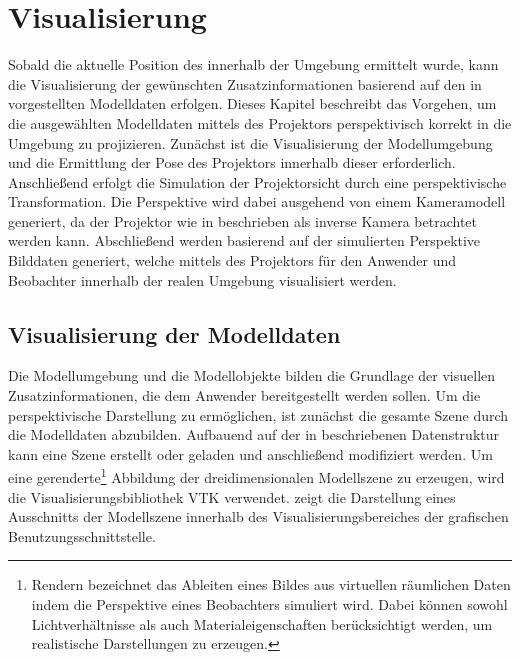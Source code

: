 \chapter{Visualisierung}
\label{chap.vis}

\prever{
}

Sobald die aktuelle Position des  innerhalb der Umgebung ermittelt wurde, kann die Visualisierung der gewünschten Zusatzinformationen basierend auf den in  vorgestellten Modelldaten erfolgen. Dieses Kapitel beschreibt das Vorgehen, um die ausgewählten Modelldaten mittels des Projektors perspektivisch korrekt in die Umgebung zu projizieren. Zunächst ist die Visualisierung der Modellumgebung und die Ermittlung der Pose des Projektors innerhalb dieser erforderlich. Anschließend erfolgt die Simulation der Projektorsicht durch eine perspektivische Transformation. Die Perspektive wird dabei ausgehend von einem Kameramodell generiert, da der Projektor wie in  beschrieben als inverse Kamera betrachtet werden kann. Abschließend werden basierend auf der simulierten Perspektive Bilddaten generiert, welche mittels des Projektors für den Anwender und Beobachter innerhalb der realen Umgebung visualisiert werden.

\section{Visualisierung der Modelldaten}
Die Modellumgebung und die Modellobjekte bilden die Grundlage der visuellen Zusatzinformationen, die dem Anwender bereitgestellt werden sollen. Um die perspektivische Darstellung zu ermöglichen, ist zunächst die gesamte Szene durch die Modelldaten abzubilden. Aufbauend auf der in  beschriebenen Datenstruktur kann eine Szene erstellt oder geladen und anschließend modifiziert werden. Um eine gerenderte\footnote{Rendern bezeichnet das Ableiten eines Bildes aus virtuellen räumlichen Daten indem die Perspektive eines Beobachters simuliert wird. Dabei können sowohl Lichtverhältnisse als auch Materialeigenschaften berücksichtigt werden, um realistische Darstellungen zu erzeugen.} Abbildung der dreidimensionalen Modellszene zu erzeugen, wird die Visualisierungsbibliothek VTK verwendet.  zeigt die Darstellung eines Ausschnitts der Modellszene innerhalb des Visualisierungsbereiches der grafischen Benutzungsschnittstelle.\\

